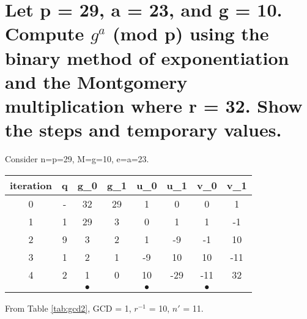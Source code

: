 \documentclass[11pt, pdftex]{article}
\begin{document}
\section{Let p = 29, a = 23, and g = 10. Compute $g^{a}$ (mod p) using the binary method of exponentiation and the Montgomery multiplication where r = 32. Show the steps and temporary values.}
Consider n=p=29, M=g=10, e=a=23.
\begin{center}
\begin{tabular}{c||c|c|c|c|c|c|c} 
iteration & q & g_{0} & g_{1} & u_{0} & u_{1} & v_{0} & v_{1}\\
\hline
0 & - & 32 & 29 & 1 & 0 & 0 & 1 \\
\hline
1 & 1 & 29 & 3 & 0 & 1 & 1 & -1 \\
\hline
2 & 9 & 3 & 2 & 1 & -9 & -1 & 10\\
\hline
3 & 1 & 2 & 1 & -9 & 10 & 10 & -11\\
\hline
4 & 2 & 1 & 0 & 10 & -29 & -11 & 32 \\
\hline
& & $\bullet$ & & $\bullet$ & & $\bullet$ & \\
\end{tabular}
\label{tab:gcd2}
\end{center}
From Table \ref{tab:gcd2}, GCD = 1, $r^{-1}$ = 10, $n'$ = 11. \\
\end{document}
